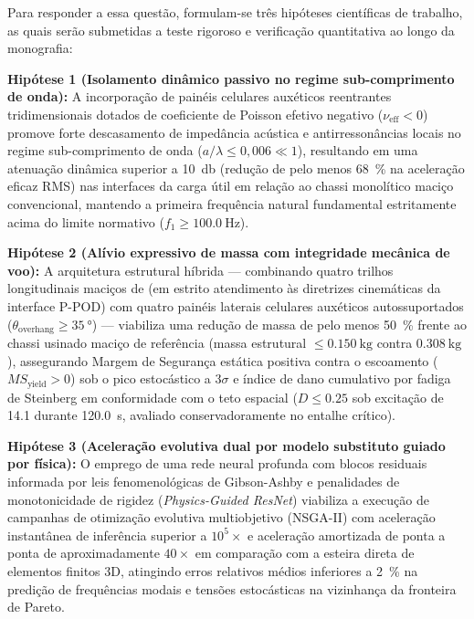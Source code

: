 Para responder a essa questão, formulam-se três hipóteses científicas de trabalho, as quais serão submetidas a teste rigoroso e verificação quantitativa ao longo da monografia:
\begin{alineas}
  \item \textbf{Hipótese 1 (Isolamento dinâmico passivo no regime sub-comprimento de onda):} A incorporação de painéis celulares auxéticos reentrantes tridimensionais dotados de coeficiente de Poisson efetivo negativo ($\nu_{\text{eff}} < 0$) promove forte descasamento de impedância acústica e antirressonâncias locais no regime sub-comprimento de onda ($a/\lambda \le 0{,}006 \ll 1$), resultando em uma atenuação dinâmica superior a \SI{10}{\decibel} (redução de pelo menos \SI{68}{\percent} na aceleração eficaz RMS) nas interfaces da carga útil em relação ao chassi monolítico maciço convencional, mantendo a primeira frequência natural fundamental estritamente acima do limite normativo ($f_1 \ge \SI{100.0}{\hertz}$).
  \item \textbf{Hipótese 2 (Alívio expressivo de massa com integridade mecânica de voo):} A arquitetura estrutural híbrida — combinando quatro trilhos longitudinais maciços de \rail{} (em estrito atendimento às diretrizes cinemáticas da interface P-POD) com quatro painéis laterais celulares auxéticos autossuportados ($\theta_{\text{overhang}} \ge \SI{35}{\degree}$) — viabiliza uma redução de massa de pelo menos \SI{50}{\percent} frente ao chassi usinado maciço de referência (massa estrutural $\le \SI{0.150}{\kilo\gram}$ contra $\SI{0.308}{\kilo\gram}$), assegurando Margem de Segurança estática positiva contra o escoamento ($MS_{\text{yield}} > 0$) sob o pico estocástico a $3\sigma$ e índice de dano cumulativo por fadiga de Steinberg em conformidade com o teto espacial ($D \le \num{0.25}$ sob excitação de \SI{14.1}{\Grms} durante \SI{120.0}{\second}, avaliado conservadoramente no entalhe crítico).
  \item \textbf{Hipótese 3 (Aceleração evolutiva dual por modelo substituto guiado por física):} O emprego de uma rede neural profunda com blocos residuais informada por leis fenomenológicas de Gibson-Ashby e penalidades de monotonicidade de rigidez (\textit{Physics-Guided ResNet}) viabiliza a execução de campanhas de otimização evolutiva multiobjetivo (NSGA-II) com aceleração instantânea de inferência superior a $10^5\times$ e aceleração amortizada de ponta a ponta de aproximadamente $40\times$ em comparação com a esteira direta de elementos finitos 3D, atingindo erros relativos médios inferiores a \SI{2}{\percent} na predição de frequências modais e tensões estocásticas na vizinhança da fronteira de Pareto.
\end{alineas}

